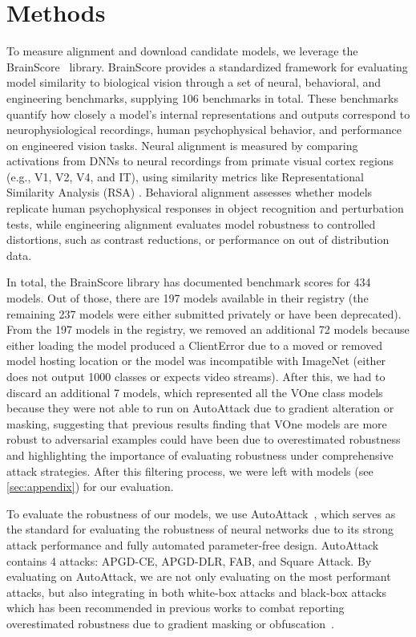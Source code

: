 \section{Methods}\label{sec:methods}

 To measure alignment and download candidate models, we leverage the BrainScore~\cite{schrimpf_brain-score_2018} library. BrainScore provides a standardized framework for evaluating model similarity to biological vision through a set of neural, behavioral, and engineering benchmarks, supplying 106 benchmarks in total. These benchmarks quantify how closely a model’s internal representations and outputs correspond to neurophysiological recordings, human psychophysical behavior, and performance on engineered vision tasks. Neural alignment is measured by comparing activations from DNNs to neural recordings from primate visual cortex regions (e.g., V1, V2, V4, and IT), using similarity metrics like Representational Similarity Analysis (RSA) \cite{kriegeskorte_representational_2008}. Behavioral alignment assesses whether models replicate human psychophysical responses in object recognition and perturbation tests, while engineering alignment evaluates model robustness to controlled distortions, such as contrast reductions, or performance on out of distribution data. 


In total, the BrainScore library has documented benchmark scores for 434 models. Out of those, there are 197 models available in their registry (the remaining 237 models were either submitted privately or have been deprecated). From the 197 models in the registry, we removed an additional 72 models because either loading the model produced a ClientError due to a moved or removed model hosting location or the model was incompatible with ImageNet (either does not output 1000 classes or expects video streams). After this, we had to discard an additional 7 models, which represented all the VOne class models~\cite{dapello_simulating_2020} because they were not able to run on AutoAttack due to gradient alteration or masking, suggesting that previous results finding that VOne models are more robust to adversarial examples could have been due to overestimated robustness and highlighting the importance of evaluating robustness under comprehensive attack strategies. After this filtering process, we were left with \nummodels{} models (see \autoref{sec:appendix}) for our evaluation.

 To evaluate the robustness of our models, we use AutoAttack~\cite{croce_reliable_2020, croce_robustbench_2021}, which serves as the standard for evaluating the robustness of neural networks due to its strong attack performance and fully automated parameter-free design. AutoAttack contains 4 attacks: APGD-CE, APGD-DLR, FAB, and Square Attack. By evaluating on AutoAttack, we are not only evaluating on the most performant attacks, but also integrating in both white-box attacks and black-box attacks which has been recommended in previous works to combat reporting overestimated robustness due to gradient masking or obfuscation~\cite{carlini_towards_2017}.


